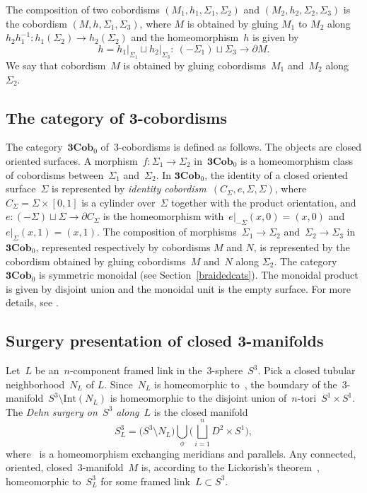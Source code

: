 \documentclass[10pt,a4paper]{amsart}
\numberwithin{equation}{section}
\newcommand{\co}{\colon}
\newcommand{\Cob}{\textbf{Cob}}
\begin{document}
The composition of two cobordisms $(M_1,h_1,\Sigma_1,\Sigma_2)$ and $(M_2,h_2,\Sigma_2,\Sigma_3)$ is the cobordism $(M,h,\Sigma_1,\Sigma_3)$, where $M$ is obtained by gluing $M_1$ to $M_2$ along $h_2h_1^{-1}\co h_1(\Sigma_2) \to h_2(\Sigma_2)$ and the homeomorphism~$h$ is given by
\[
h=h_1\vert_{\Sigma_1} \sqcup h_2\vert_{\Sigma_3} \co\ (-\Sigma_1) \sqcup \Sigma_3 \to \partial M.
\]
We say that cobordism~$M$ is obtained by gluing cobordisms~$M_1$ and~$M_2$ along~$\Sigma_2$.

\subsection{The category of 3-cobordisms}\label{sect-cob3}
The category~$\textbf{3}\Cob_0$ of~$3$-cobordisms is defined as follows.
The objects are closed oriented surfaces.
A morphism~$f\co \Sigma_1 \to \Sigma_2$ in~$\textbf{3}\Cob_0$ is a homeomorphism class of cobordisms between~$\Sigma_1$ and~$\Sigma_2$.
In $\textbf{3}\Cob_0$, the identity of a closed oriented surface~$\Sigma$ is re\-presented by \emph{identity cobordism}~$(C_\Sigma,e,\Sigma,\Sigma)$, where~$C_\Sigma=\Sigma\times [0,1]$ is a cylinder over~$\Sigma$ together with the product orientation, and~$e\co (-\Sigma)\sqcup \Sigma \to \partial C_{\Sigma}$ is the homeomorphism with~$e\vert_{-\Sigma}(x,0)=(x,0)$ and~$e\vert_{\Sigma}(x,1)=(x,1)$.
The composition of morphisms~$\Sigma_1\to \Sigma_2$ and~$\Sigma_2 \to \Sigma_3$ in~$\textbf{3}\Cob_0$, re\-presented respectively by cobordisms $M$ and $N$, is re\-presented by the cobordism obtained by gluing cobordisms~$M$ and~$N$ along $\Sigma_2$.
The category~$\textbf{3}\Cob_0$ is symmetric monoidal (see Section~\ref{braidedcats}). The monoidal product is given by disjoint
union and the monoidal unit is the empty surface. For more details, see \cite{moncatstft}.

\subsection{Surgery presentation of closed 3-manifolds} \label{dehn}
Let~$L$ be an~$n$-component framed link in the~$3$-sphere~$S^3$. Pick a closed tubular neighborhood~$N_L$ of $L$.
Since~$N_L$ is ho\-meo\-morphic to~, the boundary of the~$3$-manifold~$S^3 \setminus \mathrm{Int}(N_L)$ is homeomorphic to the disjoint union of~$n$-tori~$S^1 \times S^1$.
The \textit{Dehn surgery on~$S^3$ along}~$L$ is the closed manifold
\[
S^3_L=\bigl(S^3\setminus N_L\bigr)\bigcup_{\phi} \biggr(\bigsqcup_{i=1}^n D^2\times S^1\biggr),
\]
where~\smash{$\phi\co \partial\bigl(S^3\setminus \mathrm{Int}(N_L)\bigr)\to \bigsqcup_{i=1}^n S^1\times S^1$} is a ho\-me\-o\-mor\-phism ex\-changing me\-ri\-dians and pa\-ral\-lels.
Any connected, oriented, closed~$3$-manifold~$M$ is, according to the Lickorish's theorem~\cite[Section~12]{lickorish97}, homeomorphic to~$S^3_L$ for some framed link~$L\subset S^3$.
\end{document}
